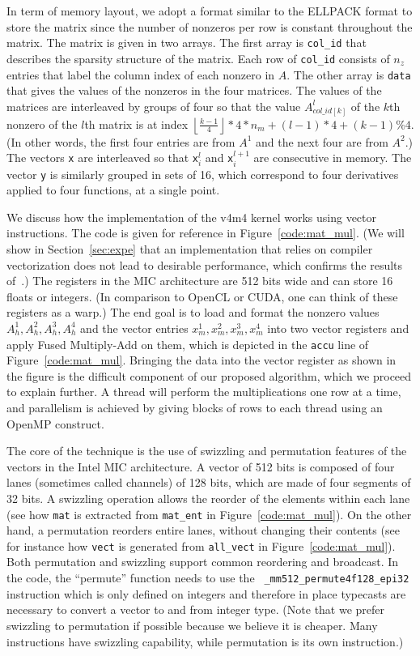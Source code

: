 \documentclass[10pt,conference,compsocconf]{IEEEtran}
\newcommand{\floor}[1]{\left\lfloor#1\right\rfloor}
\begin{document}
In term of memory layout, we adopt a format similar to the ELLPACK
format to store the matrix since the number of nonzeros per row is
constant throughout the matrix. The matrix is given in two arrays. The
first array is {\tt col\_id} that describes the
sparsity structure of the matrix. Each row of {\tt col\_id} consists
of $n_z$ entries that label the column index of each nonzero in
$A$. The other array is  {\tt data} that gives the values of
the nonzeros in the four matrices. The values of the matrices are
interleaved by groups of four so that the value $A^l_{col\_id[k]}$ of
the $k$th nonzero of the $l$th matrix is at index $\floor{\frac{k-1}{4}}*4*n_m + (l-1)*4+(k-1)\%4$.
(In other words, the first four entries are from $A^{1}$ and the 
next four are from $A^2$.) The vectors {\tt x} are
interleaved so that {\tt x}$^l_i$ and {\tt x}$^{l+1}_i$ are
consecutive in memory. The vector {\tt y} is similarly 
grouped in sets of 16, which correspond to four derivatives applied to
four functions, at a single point.


We discuss how the implementation of the v4m4 kernel works using
vector instructions. The code is given for reference in
Figure~\ref{code:mat_mul}. (We will show in Section~\ref{sec:expe}
that an implementation that relies on compiler vectorization does not lead
to desirable performance, which confirms the results
of~\cite{Saule13-ARXIV}.) The registers in the MIC architecture are
512 bits wide and can store 16 floats or integers. (In comparison to
OpenCL or CUDA, one can think of these registers as a warp.) The end
goal is to load and format the nonzero values $A_h^1,A_h^2,A_h^3,A_h^4$
and the vector entries $x_m^1,x_m^2,x_m^3,x_m^4$ into two vector registers and 
apply Fused Multiply-Add on them, which is depicted in the {\tt accu} line of 
Figure~\ref{code:mat_mul}. Bringing the data into the vector
register as shown in the figure is the difficult component of our 
proposed algorithm, which we proceed to explain further. 
A thread will perform the multiplications one row at a time,
and parallelism is achieved by giving blocks of rows to each thread
using an OpenMP construct.


The core of the technique is the use of swizzling and permutation
features of the vectors in the Intel MIC architecture. A vector of 512
bits is composed of four lanes (sometimes called channels) of 128
bits, which are made of four segments of 32 bits. A swizzling
operation allows the reorder of the elements within each lane (see how
{\tt mat} is extracted from {\tt mat\_ent} in
Figure~\ref{code:mat_mul}). On the other hand, a permutation reorders entire lanes,
without changing their contents (see for instance how {\tt vect} is
generated from {\tt all\_vect} in Figure~\ref{code:mat_mul}).  Both
permutation and swizzling support common reordering and broadcast. In
the code, the ``permute'' function needs to use the {\tt
  \_mm512\_permute4f128\_epi32} instruction which is only defined on
integers and therefore in place typecasts are necessary to convert
a vector to and from integer type.  (Note that we prefer swizzling to
permutation if possible because we believe it is cheaper. Many
instructions have swizzling capability, while permutation is its own
instruction.)
\end{document}
